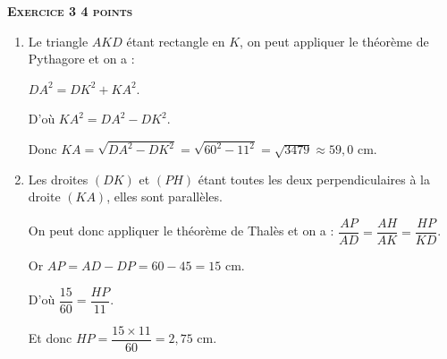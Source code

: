 \textbf{\textsc{Exercice 3 \hfill 4 points}}

\medskip

\begin{enumerate}
  \item Le triangle $AKD$ étant rectangle en $K$, on peut appliquer le théorème de Pythagore et on a :
  
$DA^2 = DK^2 + KA^2$.
  
D'où $KA^2 = DA^2 - DK^2$.
  
Donc $KA = \sqrt{DA^2-DK^2} = \sqrt{60^2-11^2} = \sqrt{3479} \approx 59,0$ cm.
  \item Les droites $(DK)$ et $(PH)$ étant toutes les deux perpendiculaires à la droite $(KA)$, elles sont parallèles.
  
  On peut donc appliquer le théorème de Thalès et on a : $\dfrac{AP}{AD}=\dfrac{AH}{AK}=\dfrac{HP}{KD}$.
  
Or $AP = AD - DP = 60 - 45 = 15$ cm.
  
D'où $\dfrac{15}{60}=\dfrac{HP}{11}$.
  
Et donc $HP = \dfrac{15 \times 11}{60} = 2,75$ cm.
\end{enumerate}

\medskip

